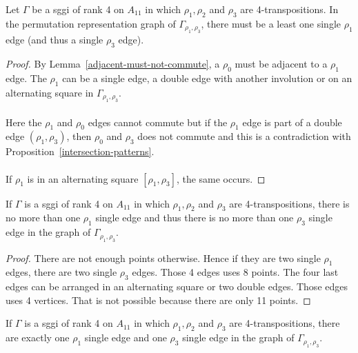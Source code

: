 \begin{lemma}
  Let $\Gamma$ be a sggi of rank 4 on $A_{11}$ in which $\rho_1, \rho_2$ and $\rho_3$ are 4-transpositions. In the permutation representation graph of $\Gamma_{\rho_1, \rho_3}$, there must be a least one single $\rho_1$ edge (and thus a single $\rho_3$ edge).
\end{lemma}

\begin{proof}
  By Lemma~\ref{adjacent-must-not-commute}, a $\rho_0$ must be adjacent to a $\rho_1$ edge. The $\rho_1$ can be a single edge, a double edge with another involution or on an alternating square in $\Gamma_{\rho_1, \rho_3}$.

  \paragraph{}
  Here the $\rho_1$ and $\rho_0$ edges cannot commute but if the $\rho_1$ edge is part of a double edge $(\rho_1, \rho_3)$, then $\rho_0$ and $\rho_3$ does not commute and this is a contradiction with Proposition~\ref{intersection-patterns}.

  \paragraph{}
  If $\rho_1$ is in an alternating square $[\rho_1, \rho_3]$, the same occurs.

\end{proof}

\begin{lemma}
    If $\Gamma$ is a sggi of rank 4 on $A_{11}$ in which $\rho_1, \rho_2$ and $\rho_3$ are 4-transpositions, there is no more than one $\rho_1$ single edge and thus there is no more than one $\rho_3$ single edge in the graph of $\Gamma_{\rho_1, \rho_3}$.
\end{lemma}

\begin{proof}
  There are not enough points otherwise. Hence if they are two single $\rho_1$ edges, there are two single $\rho_3$ edges. Those 4 edges uses 8 points. The four last edges can be arranged in an alternating square or two double edges. Those edges uses 4 vertices. That is not possible because there are only 11 points.
\end{proof}

\begin{corollary}
  \label{rank-4-single-1}
    If $\Gamma$ is a sggi of rank 4 on $A_{11}$ in which $\rho_1, \rho_2$ and $\rho_3$ are 4-transpositions, there are exactly one $\rho_1$ single edge and one $\rho_3$ single edge in the graph of $\Gamma_{\rho_1, \rho_3}$.
\end{corollary}

